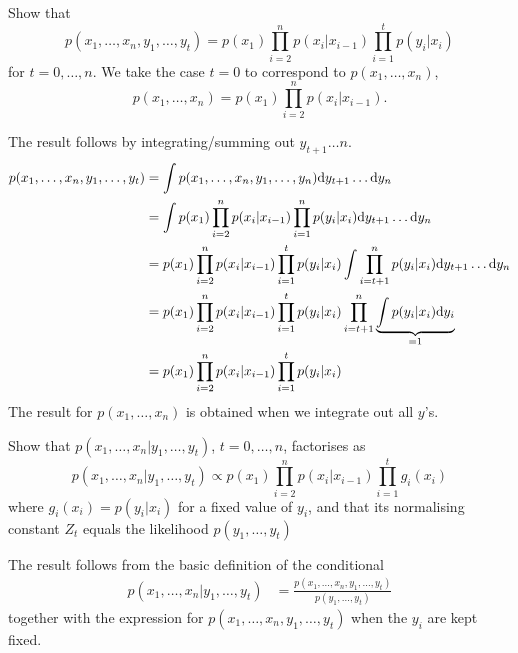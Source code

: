  \begin{exenumerate}

 \item Show that
   \begin{equation}
     p(x_1, \ldots, x_n, y_1, \ldots, y_t) =  p(x_1) \prod_{i=2}^n p(x_i|x_{i-1}) \prod_{i=1}^t p(y_i|x_i)
   \end{equation}
   for $t=0, \ldots, n$. We take the case $t=0$ to correspond to $p(x_1, \ldots, x_n)$,
   \begin{equation}
     p(x_1, \ldots, x_n) =  p(x_1) \prod_{i=2}^n p(x_i|x_{i-1}).
   \end{equation}
   
   \begin{solution}
     The result follows by integrating/summing out $y_{t+1} \ldots n$.
     \begin{align}
       p(x_1, \ldots, x_n, y_1, \ldots, y_t) & = \int p(x_1, \ldots, x_n, y_1, \ldots, y_n) \mathrm{d} y_{t+1} \ldots \mathrm{d} y_n \\
       & = \int  p(x_1) \prod_{i=2}^n p(x_i|x_{i-1}) \prod_{i=1}^n p(y_i|x_i)\mathrm{d} y_{t+1} \ldots \mathrm{d} y_n \\
       & =  p(x_1) \prod_{i=2}^n p(x_i|x_{i-1}) \prod_{i=1}^t p(y_i|x_i) \int  \prod_{i=t+1}^n p(y_i|x_i)\mathrm{d} y_{t+1} \ldots \mathrm{d} y_n \\
       &=  p(x_1) \prod_{i=2}^n p(x_i|x_{i-1}) \prod_{i=1}^t p(y_i|x_i)   \prod_{i=t+1}^n \underbrace{\int p(y_i|x_i)\mathrm{d} y_{i}}_{=1} \\
       & =  p(x_1) \prod_{i=2}^n p(x_i|x_{i-1}) \prod_{i=1}^t p(y_i|x_i)
     \end{align}
     The result for $p(x_1, \ldots, x_n)$ is obtained when we integrate out all
     $y$'s.

   \end{solution}

 \item Show that $p(x_1, \ldots, x_n | y_1, \ldots, y_t)$, $t=0,
   \ldots, n$, factorises as
\begin{equation}
  p(x_1, \ldots, x_n | y_1, \ldots, y_t) \propto  p(x_1) \prod_{i=2}^n p(x_i|x_{i-1}) \prod_{i=1}^t g_i(x_i)
  \label{eq:HMM-conditional-factorisation}
\end{equation}
where $g_i(x_i) = p(y_i|x_i)$ for a fixed value of $y_i$, and that its normalising constant $Z_t$ equals the likelihood $p(y_1, \ldots, y_t)$

\begin{solution}
The result follows from the basic definition of the conditional
\begin{align}
  p(x_1, \ldots, x_n | y_1, \ldots, y_t) & = \frac{p(x_1, \ldots, x_n, y_1, \ldots, y_t)}{p(y_1, \ldots, y_t)}
\end{align}
together with the expression for $p(x_1, \ldots, x_n, y_1, \ldots, y_t)$ when the $y_i$ are kept fixed.
\end{solution}


\end{exenumerate}
